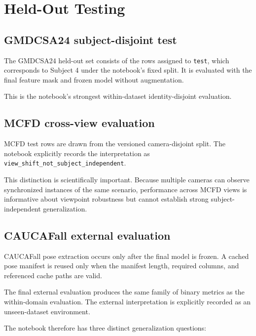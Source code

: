 \documentclass[11pt,a4paper]{article}
\newcommand{\code}[1]{\texttt{#1}}
\begin{document}
\section{Held-Out Testing}

\subsection{GMDCSA24 subject-disjoint test}

The GMDCSA24 held-out set consists of the rows assigned to \code{test}, which corresponds to Subject 4 under the notebook's fixed split. It is evaluated with the final feature mask and frozen model without augmentation.

This is the notebook's strongest within-dataset identity-disjoint evaluation.

\subsection{MCFD cross-view evaluation}

MCFD test rows are drawn from the versioned camera-disjoint split. The notebook explicitly records the interpretation as \code{view\_shift\_not\_subject\_independent}.

This distinction is scientifically important. Because multiple cameras can observe synchronized instances of the same scenario, performance across MCFD views is informative about viewpoint robustness but cannot establish strong subject-independent generalization.

\subsection{CAUCAFall external evaluation}

CAUCAFall pose extraction occurs only after the final model is frozen. A cached pose manifest is reused only when the manifest length, required columns, and referenced cache paths are valid.

The final external evaluation produces the same family of binary metrics as the within-domain evaluation. The external interpretation is explicitly recorded as an unseen-dataset environment.

The notebook therefore has three distinct generalization questions:
\end{document}
